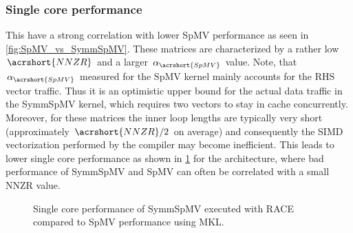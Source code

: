 \subsubsection{Single core performance}
 This have
a strong correlation with lower \acrshort{SpMV} performance as seen in \cref{fig:SpMV_vs_SymmSpMV}.
 These matrices are characterized by a rather low $\acrshort{NNZR}$ and a 
 larger $\alpha_{\acrshort{SpMV}}$ value. Note, that  $\alpha_{\acrshort{SpMV}}$ 
 measured for the \acrshort{SpMV}  kernel mainly accounts for the RHS vector traffic. 
 Thus it is an optimistic upper bound for the actual data traffic in the \acrshort{SymmSpMV} 
 kernel, which requires two vectors to stay in cache concurrently. 
 Moreover, for these matrices the inner loop lengths are typically very short (approximately $\acrshort{NNZR}/2$ on average) and consequently the SIMD vectorization performed by the 
 compiler may become inefficient. This leads to lower single core performance
  as shown in \cref{fig:SpMV_vs_SymmSpMV_single_core} for the \SKX architecture, 
  where bad performance of \acrshort{SymmSpMV}  and \acrshort{SpMV} can often be 
  correlated with a small \acrshort{NNZR} value. 
%
 \begin{figure}[tbp]
 	\centering
 	\caption{Single core performance of \acrshort{SymmSpMV} executed with \acrshort{RACE} compared to \acrshort{SpMV} performance using \acrshort{MKL}.}
 	\label{fig:SpMV_vs_SymmSpMV_single_core}
 \end{figure}
